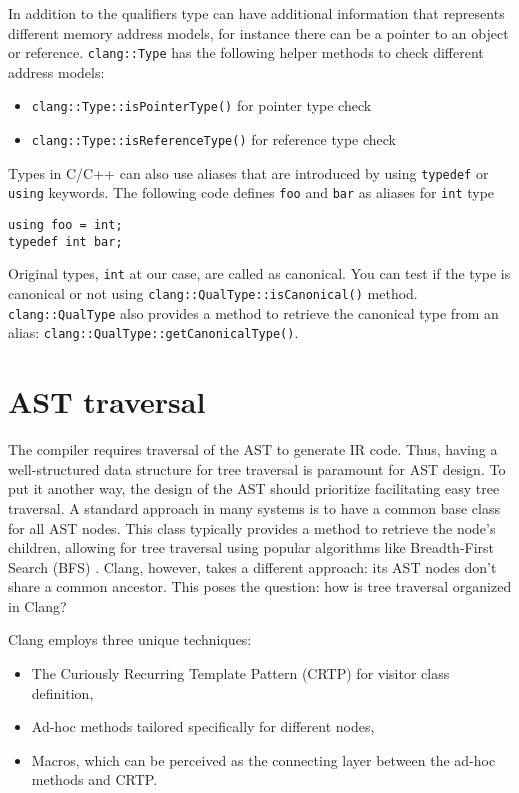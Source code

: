 In addition to the qualifiers type can have additional information that
represents different memory address models, for instance there can be a
pointer to an object or
reference. \texttt{clang::Type}
has the following helper methods to check different address models:
\begin{itemize}
\item \texttt{clang::Type::isPointerType()} for pointer type check
\item \texttt{clang::Type::isReferenceType()} for reference type check
\end{itemize}

Types in C/C++ can also use aliases that are introduced by using
\texttt{typedef} or \texttt{using} keywords. The following
code defines \texttt{foo} and \texttt{bar} as aliases for
\texttt{int} type
\begin{verbatim}
using foo = int;
typedef int bar;
\end{verbatim}
Original types, \texttt{int} at our case, are called as canonical. You
can test if the type is canonical or not using
\texttt{clang::QualType::isCanonical()}
method. \texttt{clang::QualType} also provides a method to retrieve the
canonical type from an alias: \texttt{clang::QualType::getCanonicalType()}.

\section{AST traversal}
The compiler requires traversal of the AST to generate IR code. Thus, having a
well-structured data structure for tree traversal is paramount for AST
design. To put it another way, the design of the AST should prioritize
facilitating easy tree traversal. A standard approach in many systems is to have
a common base class for all AST nodes. This class typically provides a method to
retrieve the node's children, allowing for tree traversal using popular
algorithms like Breadth-First Search (BFS)
\cite{book:cormen2009introduction}. Clang, however, takes a different approach:
its AST nodes don't share a common ancestor. This poses the question: how is
tree traversal organized in Clang? 

Clang employs three unique techniques:
\begin{itemize}
\item The Curiously Recurring Template Pattern (CRTP) for visitor class definition,
\item Ad-hoc methods tailored specifically for different nodes,
\item Macros, which can be perceived as the connecting layer between the ad-hoc methods and CRTP.
\end{itemize}

